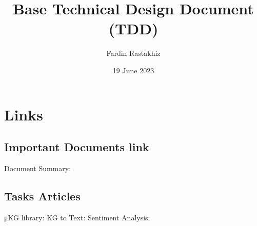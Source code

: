 \documentclass[a4paper, 10pt]{report}
\title{Base Technical Design Document (TDD)}
\author{Fardin Rastakhiz}
\date{19 June 2023}
\newcommand{\chref}[3][blue]{\href{#2}{\color{#1}{#3}}}
\begin{document}
    \maketitle
    \section*{Links}
        \subsection*{Important Documents link}
            Document Summary:
        \subsection*{Tasks Articles}
            μKG library: \chref {https://paperswithcode.com/paper/m-text-kg-a-library-for-multi-source}{µKG: A Library for Multi-source Knowledge Graph Embeddings and Applications} \newline
            KG to Text: \chref{https://paperswithcode.com/paper/text-generation-from-knowledge-graphs-with}{Text Generation from Knowledge Graphs with Graph Transformers} \newline
            Sentiment Analysis:	\chref{https://paperswithcode.com/paper/cross-domain-aspect-extraction-using}{Cross-Domain Aspect Extraction using Transformers Augmented with Knowledge Graphs} \newline
\end{document}
